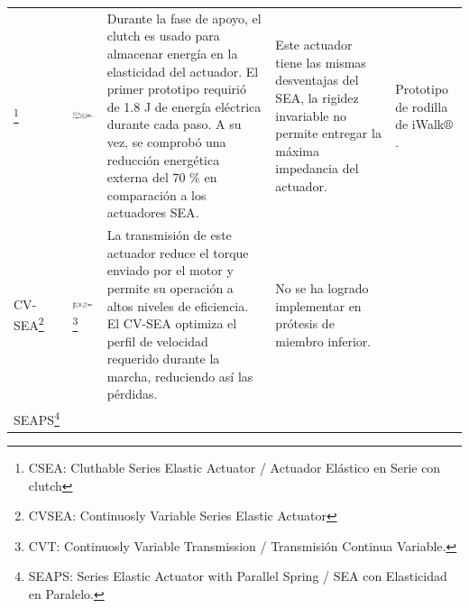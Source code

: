 \documentclass[12pt,english]{article}
\providecommand{\tabularnewline}{\\}
\begin{document}
\begin{center}
\begin{longtable}{|>{\centering}p{15mm}|>{\centering}p{30mm}|>{\centering}p{40mm}|>{\centering}p{40mm}|>{\centering}p{24mm}|}
{\small{}-Prototipo transfemoral de la U. Vanderbilt \cite{Sup2008,Sup2009,Varol2010,Ha2011}.}\tabularnewline
\hline 
{\small{}CSEA}\footnote{CSEA: Cluthable Series Elastic Actuator / Actuador Elástico en Serie
con clutch}{\small{} } & {\small{}\vspace{15 mm}}{\small \par}

{\small{}\includegraphics[scale=0.4]{CSEA.png}} & {\small{}Durante la fase de apoyo, el clutch es usado para almacenar
energía en la elasticidad del actuador. El primer prototipo requirió
de 1.8 J de energía eléctrica durante cada paso\cite{Rouse2014}.
A su vez, se comprobó una reducción energética externa del 70 \% en comparación
a los actuadores SEA\cite{Rouse2013}.} & {\small{}Este actuador tiene las mismas desventajas del SEA, la rigidez
invariable no permite entregar la máxima impedancia del actuador\cite{Rouse2014}.} & {\small{}Prototipo de rodilla de iWalk$\circledR$.}\tabularnewline
\hline 
{\small{}CV-SEA}\footnote{CVSEA: Continuosly Variable Series Elastic Actuator} & {\small{}\vspace{10 mm}}{\small \par}

{\small{}\includegraphics[scale=0.35]{CVSEA.PNG}}\footnote{{\small{}CVT: Continuosly Variable Transmission / Transmisión Continua
Variable.}} & {\small{}La transmisión de este actuador reduce el torque enviado
por el motor y permite su operación a altos niveles de eficiencia.
El CV-SEA optimiza el perfil de velocidad requerido durante la marcha,
reduciendo así las pérdidas\cite{Mooney}.} & {\small{}No se ha logrado implementar en prótesis de miembro inferior.} & \tabularnewline
\hline 
{\small{}SEAPS}\footnote{SEAPS: Series Elastic Actuator with Parallel Spring / SEA con Elasticidad
en Paralelo.} & {\small{}\vspace{5 mm}}{\small \par}


\end{longtable}
\end{center}
\end{document}
